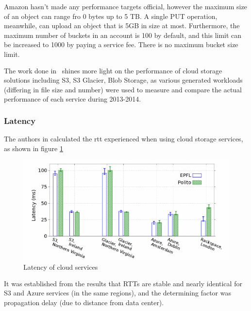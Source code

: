 Amazon hasn't made any performance targets official, however the maximum size of an object can range fro 0 bytes up to 5 TB. A single PUT operation, meanwhile, can upload an object that is 5GB in size at most. Furthermore, the maximum number of buckets in an account is 100 by default, and this limit can be increased to 1000 by paying a service fee. There is no maximum bucket size limit.~\cite{s3faq, s3_limits}

The work done in~\cite{s3vsblob_performance} shines more light on the performance of cloud storage solutions including S3, S3 Glacier, Blob Storage, as various generated workloads (differing in file size and number) were used to measure and compare the actual performance of each service during 2013-2014.

\subsubsection{Latency}
The authors in \cite{s3vsblob_performance} calculated the \ac{rtt} experienced when using cloud storage services, as shown in figure \ref{fig:latency}
\begin{figure} [h]
    \centering
    \includegraphics[scale=0.7]{images/latency}
    \caption{\label{fig:latency}Latency of cloud services}
\end{figure}


It was established from the results that RTTs are stable and nearly identical for S3 and Azure services (in the same regions), and the determining factor was propagation delay (due to distance from data center).

